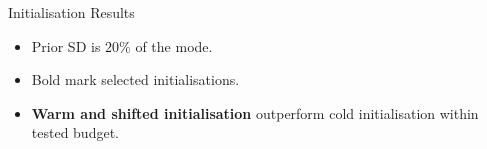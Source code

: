 


\begin{frame}{Initialisation Results}
\label{frm:appendix-initialisation-results}
\begin{itemize}
\item Prior SD is $20\%$ of the mode.
\item Bold mark selected initialisations.
\item \textbf{Warm and shifted initialisation} outperform cold initialisation within tested budget.
\end{itemize}
\end{frame}

